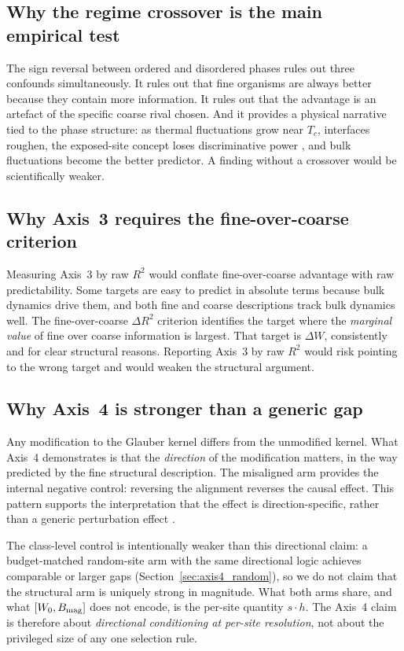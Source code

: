 \documentclass[aps,pre,preprint,superscriptaddress,showpacs]{revtex4-2}
\begin{document}
\subsection{Why the regime crossover is the main empirical test}

The sign reversal between ordered and disordered phases rules out three
confounds simultaneously.
It rules out that fine organisms are always better because they contain
more information.
It rules out that the advantage is an artefact of the specific coarse
rival chosen.
And it provides a physical narrative tied to the phase structure: as
thermal fluctuations grow near $T_c$, interfaces roughen, the exposed-site
concept loses discriminative power \cite{bray1994}, and bulk fluctuations
become the better predictor.
A finding without a crossover would be scientifically weaker.

\subsection{Why Axis~3 requires the fine-over-coarse criterion}

Measuring Axis~3 by raw $R^2$ would conflate fine-over-coarse advantage with
raw predictability.
Some targets are easy to predict in absolute terms because bulk dynamics
drive them, and both fine and coarse descriptions track bulk dynamics well.
The fine-over-coarse $\Delta R^2$ criterion identifies the target where
the \textit{marginal value} of fine over coarse information is largest.
That target is $\Delta W$, consistently and for clear structural reasons.
Reporting Axis~3 by raw $R^2$ would risk pointing to the wrong target
and would weaken the structural argument.

\subsection{Why Axis~4 is stronger than a generic gap}

Any modification to the Glauber kernel differs from the unmodified kernel.
What Axis~4 demonstrates is that the \textit{direction} of the modification
matters, in the way predicted by the fine structural description.
The misaligned arm provides the internal negative control:
reversing the alignment reverses the causal effect.
This pattern supports the interpretation that the effect is direction-specific,
rather than a generic perturbation effect \cite{woodward2003,pearl2009}.

The class-level control is intentionally weaker than this directional
claim: a budget-matched random-site arm with the same directional logic
achieves comparable or larger gaps (Section~\ref{sec:axis4_random}), so
we do not claim that the structural arm is uniquely strong in magnitude.
What both arms share, and what $[W_0,B_{\rm mag}]$ does not encode, is
the per-site quantity $s\cdot h$.
The Axis~4 claim is therefore about \emph{directional conditioning at
per-site resolution}, not about the privileged size of any one
selection rule.
\end{document}
